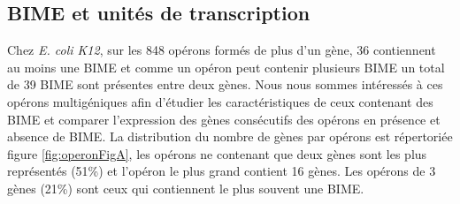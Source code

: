 \documentclass[12pt,a4paper]{report}
\begin{document}
\begin{onehalfspace}
\section*{BIME et unités de transcription}
Chez \textit{E. coli K12}, sur les 848 opérons formés de plus d'un gène, 36 contiennent au moins une BIME et comme un opéron peut contenir plusieurs BIME un total de 39 BIME sont présentes entre deux gènes. Nous nous sommes intéressés à ces opérons multigéniques afin d'étudier les caractéristiques de ceux contenant des BIME et comparer l'expression des gènes consécutifs des opérons en présence et absence de BIME. La distribution du nombre de gènes par opérons est répertoriée figure \autoref{fig:operonFigA}, les opérons ne contenant que deux gènes sont les plus représentés (51\%) et l'opéron le plus grand contient 16 gènes. Les opérons de 3 gènes (21\%) sont ceux qui contiennent le plus souvent une BIME.


\end{onehalfspace}
\end{document}
